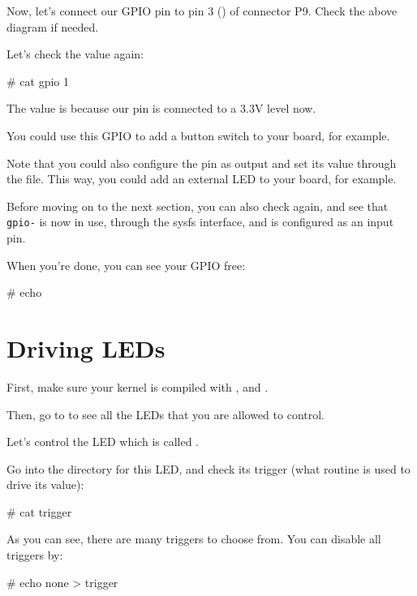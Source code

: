 {Now, let's connect our GPIO pin to pin 3 () of connector P9. Check the above diagram if needed.

Let's check the value again:

\begin{bashinput}
# cat gpio%
1
\end{bashinput}

The value is  because our pin is connected to a 3.3V level now.

You could use this GPIO to add a button switch to your board, for
example.

Note that you could also configure the pin as output and set its value
through the  file. This way, you could add an external LED
to your board, for example.

Before moving on to the next section, you can also check
 again, and see that {\tt gpio-\gpionum} is now
in use, through the sysfs interface, and is configured as an input pin.

When you're done, you can see your GPIO free:

\begin{bashinput}
# echo %
\end{bashinput}

\section{Driving LEDs}

First, make sure your kernel is compiled with
, 
and .

Then, go to  to see all the LEDs that you are allowed
to control.

Let's control the LED which is called
.

Go into the directory for this LED, and check its trigger (what
routine is used to drive its value):

\begin{bashinput}
# cat trigger
\end{bashinput}

As you can see, there are many triggers to choose from.
You can disable all triggers by:

\begin{bashinput}
# echo none > trigger
\end{bashinput}

}

